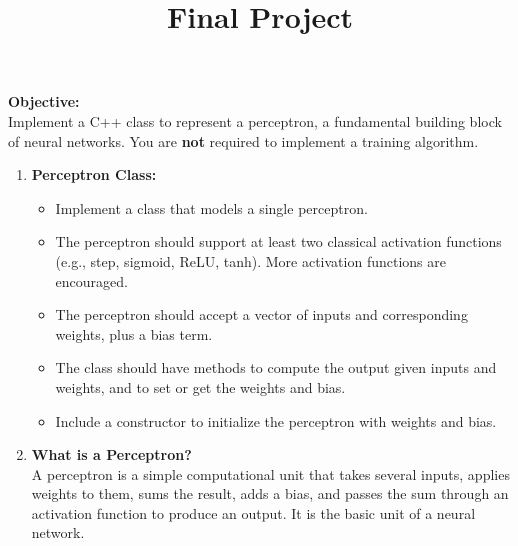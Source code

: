 \documentclass{../LatexStyle/style}
\title{\Large \bf Final Project}
\begin{document}
\maketitle

\begin{instructions}
\textbf{Objective:} \\
Implement a C++ class to represent a perceptron, a fundamental building block of neural networks. You are \textbf{not} required to implement a training algorithm.

\begin{enumerate}
    \item \textbf{Perceptron Class:}
    \begin{itemize}
        \item Implement a class that models a single perceptron.
        \item The perceptron should support at least two classical activation functions (e.g., step, sigmoid, ReLU, tanh). More activation functions are encouraged.
        \item The perceptron should accept a vector of inputs and corresponding weights, plus a bias term.
        \item The class should have methods to compute the output given inputs and weights, and to set or get the weights and bias.
        \item Include a constructor to initialize the perceptron with weights and bias.
    \end{itemize}

    \item \textbf{What is a Perceptron?} \\
    A perceptron is a simple computational unit that takes several inputs, applies weights to them, sums the result, adds a bias, and passes the sum through an activation function to produce an output. It is the basic unit of a neural network.

    \begin{center}
    \end{center}


\end{enumerate}
\end{instructions}
\end{document}
